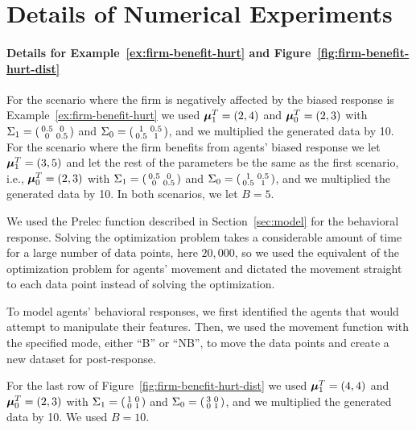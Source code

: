 \section{Details of Numerical Experiments}\label{sec:app-numerical-details}
\paragraph{Details for Example~\ref{ex:firm-benefit-hurt} and Figure~\ref{fig:firm-benefit-hurt-dist}}For the scenario where the firm is negatively affected by the biased response is Example~\ref{ex:firm-benefit-hurt} we used ${\bm{\mu}}_1^T=(2, 4)$ and ${\bm{\mu}}_0^T=(2, 3)$ with $\Sigma_1=\begin{psmallmatrix}0.5 & 0 \\ 0 & 0.5 \end{psmallmatrix}$ and $\Sigma_0=\begin{psmallmatrix}1 & 0.5 \\ 0.5 & 1 \end{psmallmatrix}$, and we multiplied the generated data by 10. For the scenario where the firm benefits from agents' biased response we let ${\bm{\mu}}_1^T=(3, 5)$ and let the rest of the parameters be the same as the first scenario, i.e., ${\bm{\mu}}_0^T=(2, 3)$ with $\Sigma_1=\begin{psmallmatrix}0.5 & 0 \\ 0 & 0.5 \end{psmallmatrix}$ and $\Sigma_0=\begin{psmallmatrix}1 & 0.5 \\ 0.5 & 1 \end{psmallmatrix}$, and we multiplied the generated data by 10. In both scenarios, we let $B=5$. 

We used the Prelec function described in Section~\ref{sec:model} for the behavioral response. Solving the optimization problem takes a considerable amount of time for a large number of data points, here $20,000$, so we used the equivalent of the optimization problem for agents' movement and dictated the movement straight to each data point instead of solving the optimization.

To model agents' behavioral responses, we first identified the agents that would attempt to manipulate their features. Then, we used the movement function with the specified mode, either ``B'' or ``NB'', to move the data points and create a new dataset for post-response. 

For the last row of Figure~\ref{fig:firm-benefit-hurt-dist} we used ${\bm{\mu}}_1^T=(4, 4)$ and ${\bm{\mu}}_0^T=(2, 3)$ with $\Sigma_1=\begin{psmallmatrix}1 & 0 \\ 0 & 1 \end{psmallmatrix}$ and $\Sigma_0=\begin{psmallmatrix}3 & 0 \\ 0 & 1 \end{psmallmatrix}$, and we multiplied the generated data by 10. We used $B=10$.

